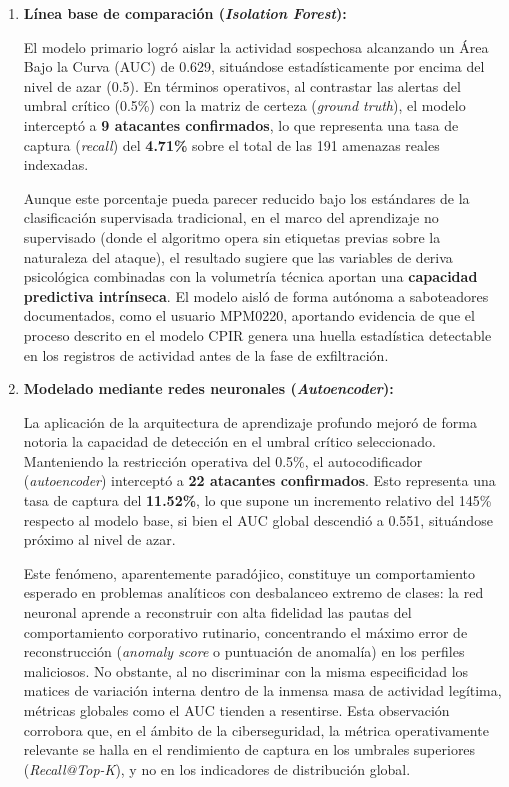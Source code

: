 \documentclass[IB]{TFUOC}%
\begin{document}
\begin{enumerate}
    \item \textbf{Línea base de comparación (\textit{Isolation Forest}):}

    El modelo primario logró aislar la actividad sospechosa alcanzando un Área Bajo la Curva (AUC) de 0.629, situándose estadísticamente por encima del nivel de azar (0.5). En términos operativos, al contrastar las alertas del umbral crítico (0.5\%) con la matriz de certeza (\textit{ground truth}), el modelo interceptó a \textbf{9 atacantes confirmados}, lo que representa una tasa de captura (\textit{recall}) del \textbf{4.71\%} sobre el total de las 191 amenazas reales indexadas.

    Aunque este porcentaje pueda parecer reducido bajo los estándares de la clasificación supervisada tradicional, en el marco del aprendizaje no supervisado (donde el algoritmo opera sin etiquetas previas sobre la naturaleza del ataque), el resultado sugiere que las variables de deriva psicológica combinadas con la volumetría técnica aportan una \textbf{capacidad predictiva intrínseca}. El modelo aisló de forma autónoma a saboteadores documentados, como el usuario MPM0220, aportando evidencia de que el proceso descrito en el modelo CPIR genera una huella estadística detectable en los registros de actividad antes de la fase de exfiltración.

    \item \textbf{Modelado mediante redes neuronales (\textit{Autoencoder}):}

    La aplicación de la arquitectura de aprendizaje profundo mejoró de forma notoria la capacidad de detección en el umbral crítico seleccionado. Manteniendo la restricción operativa del 0.5\%, el autocodificador (\textit{autoencoder}) interceptó a \textbf{22 atacantes confirmados}. Esto representa una tasa de captura del \textbf{11.52\%}, lo que supone un incremento relativo del 145\% respecto al modelo base, si bien el AUC global descendió a 0.551, situándose próximo al nivel de azar.

    Este fenómeno, aparentemente paradójico, constituye un comportamiento esperado en problemas analíticos con desbalanceo extremo de clases: la red neuronal aprende a reconstruir con alta fidelidad las pautas del comportamiento corporativo rutinario, concentrando el máximo error de reconstrucción (\textit{anomaly score} o puntuación de anomalía) en los perfiles maliciosos. No obstante, al no discriminar con la misma especificidad los matices de variación interna dentro de la inmensa masa de actividad legítima, métricas globales como el AUC tienden a resentirse. Esta observación corrobora que, en el ámbito de la ciberseguridad, la métrica operativamente relevante se halla en el rendimiento de captura en los umbrales superiores (\textit{Recall@Top-K}), y no en los indicadores de distribución global.


\end{enumerate}
\end{document}
